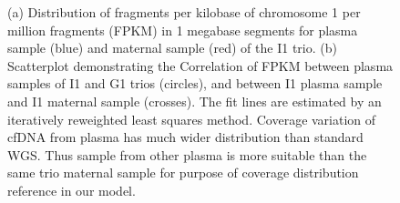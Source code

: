 \begin{figure}[h]
\hspace{20pt}
\subfigure[]{\label{fig:histo:b}
	\begin{minipage}[b]{0.45\textwidth}
		\centering

	\end{minipage}	
}
	
\label{fig:fpkm}
\caption{(a) Distribution of fragments per kilobase of chromosome 1 per million fragments (FPKM) in 1 megabase segments for plasma sample (blue) and maternal sample (red) of the I1 trio. (b) Scatterplot demonstrating the Correlation of FPKM between plasma samples of I1 and G1 trios (circles), and between I1 plasma sample and I1 maternal sample (crosses). The fit lines are estimated by an iteratively reweighted least squares method. Coverage variation of cfDNA from plasma has much wider distribution than standard WGS. Thus sample from other plasma is more suitable than the same trio maternal sample for purpose of coverage distribution reference in our model.  }\label{fig:fpkm}
\end{figure}

